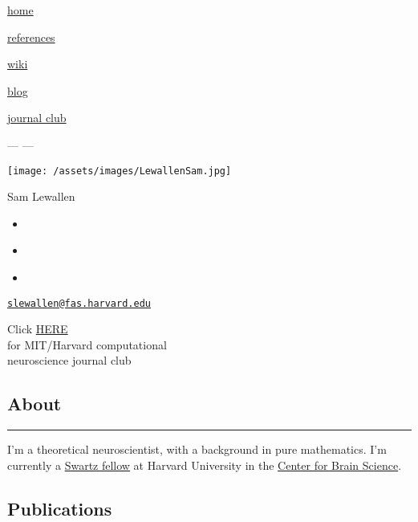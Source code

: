 \documentclass[11pt]{article}
\title{}
\def\tightlist{}
\begin{document}
\maketitle



\hypertarget{outerwrapper}{}
\hypertarget{topbar}{}
\href{/}{home}

\href{/references.html}{references}

\href{http://neurowiki.shoutwiki.com/wiki/Main_Page}{wiki}

\href{https://throughthetulgeywood.wordpress.com}{blog}

\href{https://compneurojc.github.io}{journal club}

\hypertarget{parent}{}
\hypertarget{child}{}
--- ---

\texttt{[image: /assets/images/LewallenSam.jpg]}

Sam Lewallen

\begin{itemize}
\tightlist
\item
  \href{/pdf/cv_lewallen_WEB.pdf}{\emph{}}
\item
  \href{https://scholar.google.com/citations?user=f17bjxcAAAAJ\&hl=en}{\emph{}}
\item
  \href{https://mathoverflow.net/users/492/sam-lewallen}{\emph{}}
\end{itemize}

\href{mailto:slewallen@fas.harvard.edu}{\nolinkurl{slewallen@fas.harvard.edu}}

Click \href{https://compneurojc.github.io}{HERE}\\
for MIT/Harvard computational\\
neuroscience journal club

\hypertarget{contextbox}{}
\subsection{About}\label{about}

\begin{center}\rule{0.5\linewidth}{\linethickness}\end{center}

I'm a theoretical neuroscientist, with a background in pure mathematics.
I'm currently a
\href{http://cbs.fas.harvard.edu/science/swartz-program}{Swartz fellow}
at Harvard University in the \href{http://cbs.fas.harvard.edu}{Center
for Brain Science}.

\subsection{Publications}\label{publications}
\end{document}
